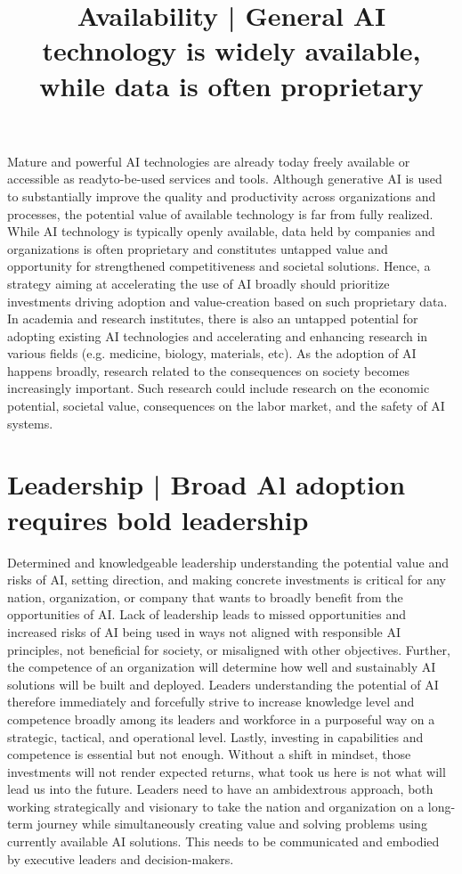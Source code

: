\title{
Availability | General AI technology is widely available, while data is often proprietary
}
Mature and powerful AI technologies are already today freely available or accessible as readyto-be-used services and tools. Although generative AI is used to substantially improve the quality and productivity across organizations and processes, the potential value of available technology is far from fully realized.
While AI technology is typically openly available, data held by companies and organizations is often proprietary and constitutes untapped value and opportunity for strengthened competitiveness and societal solutions. Hence, a strategy aiming at accelerating the use of AI broadly should prioritize investments driving adoption and value-creation based on such proprietary data.
In academia and research institutes, there is also an untapped potential for adopting existing AI technologies and accelerating and enhancing research in various fields (e.g. medicine, biology, materials, etc).
As the adoption of AI happens broadly, research related to the consequences on society becomes increasingly important. Such research could include research on the economic potential, societal value, consequences on the labor market, and the safety of AI systems.
\section*{Leadership | Broad Al adoption requires bold leadership}
Determined and knowledgeable leadership understanding the potential value and risks of AI, setting direction, and making concrete investments is critical for any nation, organization, or company that wants to broadly benefit from the opportunities of AI. Lack of leadership leads to missed opportunities and increased risks of AI being used in ways not aligned with responsible AI principles, not beneficial for society, or misaligned with other objectives.
Further, the competence of an organization will determine how well and sustainably AI solutions will be built and deployed. Leaders understanding the potential of AI therefore immediately and forcefully strive to increase knowledge level and competence broadly among its leaders and workforce in a purposeful way on a strategic, tactical, and operational level.
Lastly, investing in capabilities and competence is essential but not enough. Without a shift in mindset, those investments will not render expected returns, what took us here is not what will lead us into the future. Leaders need to have an ambidextrous approach, both working strategically and visionary to take the nation and organization on a long-term journey while simultaneously creating value and solving problems using currently available AI solutions. This needs to be communicated and embodied by executive leaders and decision-makers.

